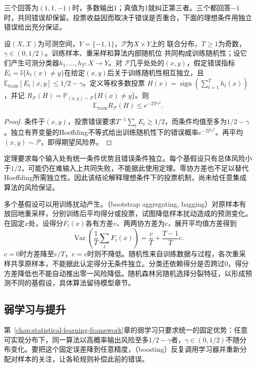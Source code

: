 三个回答为$(1,1,-1)$时，多数输出1；真值为1就纠正第三者。三个都回答$-1$时，共同错误却保留。投票收益因而取决于错误是否重合，下面的理想条件用独立错误给出充分保证。

\begin{theorem}[独立错误下的多数投票]
\label{thm:independent-majority-vote}
设$(X,\mathcal X)$为可测空间，$Y=\{-1,1\}$，$\mathcal P$为$X\times Y$上的
联合分布，$T\geq1$为奇数，$\gamma\in(0,1/2)$。训练样本、重采样和算法内部随机位
共同构成训练随机性；设它们产生可测分类器$h_1,\ldots,h_T:X\to Y$。对
$\mathcal P$几乎处处的$(x,y)$，假定错误指标
$E_t=\mathbb I\{h_t(x)\neq y\}$在给定$(x,y)$后关于训练随机性相互独立，且
$\mathbb E_{\mathrm{train}}[E_t\mid x,y]\leq1/2-\gamma$。定义等权多数投票
$H(x)=\operatorname{sign}(\sum_{t=1}^T h_t(x))$，并记
$R_{\mathcal P}(H)=\mathbb P_{(x,y)\sim\mathcal P}\{H(x)\neq y\}$。则
\[
 \mathbb E_{\mathrm{train}}R_{\mathcal P}(H)\leq e^{-2T\gamma^2}.
\]
\end{theorem}

\begin{proof}
条件于$(x,y)$，投票错误要求$T^{-1}\sum_tE_t\geq1/2$，而条件均值至多为$1/2-\gamma$。独立有界变量的Hoeffding不等式给出训练随机性下的错误概率$e^{-2T\gamma^2}$。再平均$(x,y)\sim\mathcal P$，即得期望风险界。
\end{proof}

定理要求每个输入处有统一条件优势且错误条件独立。每个基假设只有总体风险小于$1/2$，可能仍在难输入上共同失败，不能据此使用定理。零协方差也不足以替代Hoeffding所需独立性。因此该结论解释理想条件下的投票机制，尚未给任意集成算法的风险保证。

多个基假设可以用训练扰动产生。（bootstrap aggregating, bagging）对原样本有放回地重采样，分别训练后平均得分或投票，试图降低样本扰动造成的预测变化。在固定$x$处，设得分$F_t(x)$各有方差$v$、两两协方差为$c$，展开平均值方差得到
\[
 \operatorname{Var}\!\left(\frac1T\sum_tF_t(x)\right)
 =\frac{v}{T}+\frac{T-1}{T}c.
\]
$c=0$时方差降至$v/T$，$c=v$时则不降低。随机性来自训练数据与过程，各次重采样共享原样本，不能据此认定得分无条件独立。分类还依赖得分是否跨过0，得分方差降低也不能自动推出零一风险降低。随机森林另随机选择分裂特征，以形成预测不同的基假设，具体算法留待模型章节。

\subsection{弱学习与提升}

第~\ref{chap:statistical-learning-framework}章的弱学习只要求统一的固定优势：任意可实现分布下，同一算法以高概率输出风险至多$1/2-\gamma$者，$\gamma\in(0,1/2)$不随分布变化。要把这个固定误差降到任意精度，（boosting）反复调用学习器并重新分配对样本的关注，让各轮规则补偿此前的错误。

